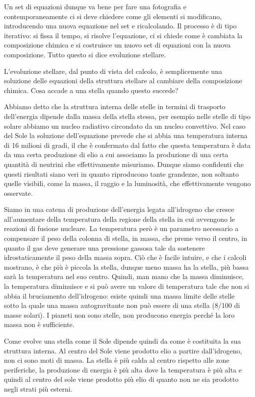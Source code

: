 Un set di equazioni dunque va bene per fare una fotografia e contemporaneamente ci si deve chiedere come gli elementi si modificano, introducendo una nuova equazione nel set e ricalcolando. Il processo è di tipo iterativo: si fissa il tempo, si risolve l'equazione, ci si chiede come è cambiata la composizione chimica e si costruisce un nuovo set di equazioni con la nuova composizione. Tutto questo si dice evoluzione stellare.

\vspace{0.2cm}L'evoluzione stellare, dal punto di vista del calcolo, è semplicemente una soluzione delle equazioni della struttura stellare al cambiare della composizione chimica. Cosa accade a una stella quando questo succede?

Abbiamo detto che la struttura interna delle stelle in termini di trasporto dell'energia dipende dalla massa della stella stessa, per esempio nelle stelle di tipo solare abbiamo un nucleo radiativo circondato da un nucleo convettivo. Nel caso del Sole la soluzione dell'equazione prevede che si abbia una temperatura interna di 16 milioni di gradi, il che è confermato dal fatto che questa temperatura è data da una certa produzione di elio a cui associamo la produzione di una certa quantità di neutrini che effettivamente misuriamo. Dunque siamo confidenti che questi risultati siano veri in quanto riproducono tante grandezze, non soltanto quelle visibili, come la massa, il raggio e la luminosità, che effettivamente vengono osservate. 

Siamo in una catena di produzione dell'energia legata all'idrogeno che cresce all'aumentare della temperatura della regione della stella in cui avvengono le reazioni di fusione nucleare. La temperatura però è un parametro necessario a compensare il peso della colonna di stella, in massa, che preme verso il centro, in quanto il gas deve generare una pressione gassosa tale da sostenere idrostaticamente il peso della massa sopra. Ciò che è facile intuire, e che i calcoli mostrano, è che più è piccola la stella, dunque meno massa ha la stella, più bassa sarà la temperatura nel suo centro. Quindi, man mano che la massa diminuisce, la temperatura diminuisce e si può avere un valore di temperatura tale che non si abbia il bruciamento dell'idrogeno: esiste quindi una massa limite delle stelle sotto la quale una massa autogravitante non può essere di una stella (8/100 di masse solari). I pianeti non sono stelle, non producono energia perché la loro massa non è sufficiente.

Come evolve una stella come il Sole dipende quindi da come è costituita la sua struttura interna. Al centro del Sole viene prodotto elio a partire dall'idrogeno, non ci sono moti di massa. La stella è più calda al centro rispetto alle zone periferiche, la produzione di energia è più alta dove la temperatura è più alta e quindi al centro del sole viene prodotto più elio di quanto non ne sia prodotto negli strati più esterni. 

